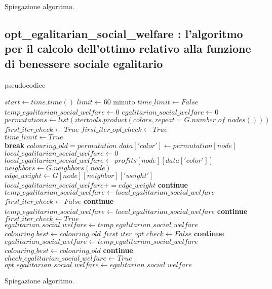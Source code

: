 Spiegazione algoritmo.

\newpage
\subsection{opt\_egalitarian\_social\_welfare : l'algoritmo per il calcolo dell'ottimo relativo alla funzione di benessere sociale egalitario}
\justify
pseudocodice \\

\begin{algorithmic}

\State $start\gets time.time()$
\State $limit\gets 60$  minuto
\State $time\_limit\gets False$ \\

\State $temp\_egalitarian\_social\_welfare\gets 0$
\State $egalitarian\_social\_welfare\gets 0$
\State $permutations\gets list(itertools.product(colors, repeat=G.number\_of\_nodes()))$
\State $first\_iter\_check\gets True$
\State $first\_iter\_opt\_check\gets True$ \\

		\State $time\_limit\gets True$ \\
		\State \textbf{break}
	\EndIf
	\State $colouring\_old = permutation$
		\State $data['color']\gets permutation[node]$
	\EndFor
		\State $local\_egalitarian\_social\_welfare\gets 0$
		\State $local\_egalitarian\_social\_welfare\gets profits[node][data['color']]$
		\State $neighbors\gets G.neighbors(node)$
				\State $edge\_weight\gets G[node][neighbor]['weight']$
				\State $local\_egalitarian\_social\_welfare += edge\_weight$
			\Else
				\State \textbf{continue}
			\EndIf
		\EndFor
			\State $temp\_egalitarian\_social\_welfare\gets local\_egalitarian\_social\_welfare$
			\State $first\_iter\_check\gets False$
			\State \textbf{continue}
		\EndIf	
			\State $temp\_egalitarian\_social\_welfare\gets local\_egalitarian\_social\_welfare$
		\Else
			\State \textbf{continue}	
		\EndIf
	\State $first\_iter\_check\gets True$
		\State $egalitarian\_social\_welfare\gets temp\_egalitarian\_social\_welfare$
		\State $colouring\_best\gets colouring\_old$
		\State $first\_iter\_opt\_check\gets False$
		\State \textbf{continue}
	\EndIf	
		\State $egalitarian\_social\_welfare\gets temp\_egalitarian\_social\_welfare$
		\State $colouring\_best\gets colouring\_old$
	\Else
		\State \textbf{continue}	
	\EndIf
	\EndFor
\EndFor \\

	\State $check\_egalitarian\_social\_welfare\gets True$
	\State $opt\_egalitarian\_social\_welfare\gets egalitarian\_social\_welfare$
\EndIf

\end{algorithmic}

Spiegazione algoritmo.